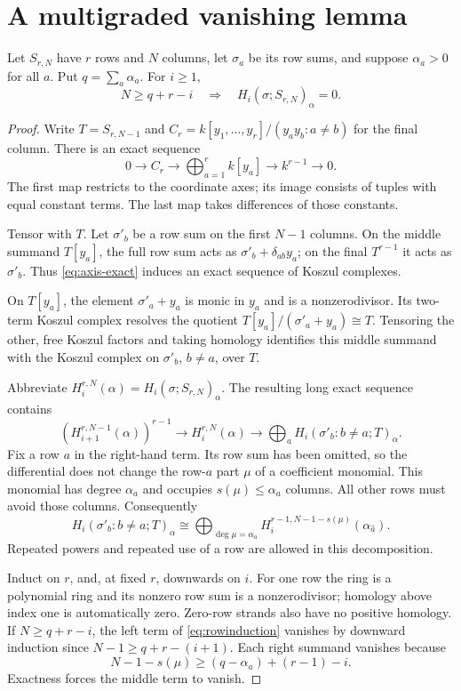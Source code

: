 \section{A multigraded vanishing lemma}
\begin{lemma}\label{lem:multigraded}
Let $S_{r,N}$ have $r$ rows and $N$ columns, let $\sigma_a$ be its row sums, and suppose $\alpha_a>0$ for all $a$. Put $q=\sum_a\alpha_a$. For $i\ge1$,
\[
 \boxed{N\ge q+r-i\quad\Longrightarrow\quad
 H_i(\sigma;S_{r,N})_\alpha=0.}
\]
\end{lemma}
\begin{proof}
Write $T=S_{r,N-1}$ and
$C_r=k[y_1,\ldots,y_r]/(y_ay_b:a\ne b)$ for the final column. There is an exact sequence
\begin{equation}\label{eq:axis-exact}
 0\longrightarrow C_r\longrightarrow\bigoplus_{a=1}^r k[y_a]
 \longrightarrow k^{r-1}\longrightarrow0.
\end{equation}
The first map restricts to the coordinate axes; its image consists of tuples with equal constant terms. The last map takes differences of those constants.

Tensor with $T$. Let $\sigma'_b$ be a row sum on the first $N-1$ columns. On the middle summand $T[y_a]$, the full row sum acts as $\sigma'_b+\delta_{ab}y_a$; on the final $T^{r-1}$ it acts as $\sigma'_b$. Thus \eqref{eq:axis-exact} induces an exact sequence of Koszul complexes.

On $T[y_a]$, the element $\sigma'_a+y_a$ is monic in $y_a$ and is a nonzerodivisor. Its two-term Koszul complex resolves the quotient $T[y_a]/(\sigma'_a+y_a)\cong T$. Tensoring the other, free Koszul factors and taking homology identifies this middle summand with the Koszul complex on $\sigma'_b$, $b\ne a$, over $T$.

Abbreviate $H_i^{r,N}(\alpha)=H_i(\sigma;S_{r,N})_\alpha$. The resulting long exact sequence contains
\begin{equation}\label{eq:rowinduction}
 (H_{i+1}^{r,N-1}(\alpha))^{r-1}
 \longrightarrow H_i^{r,N}(\alpha)
 \longrightarrow\bigoplus_a H_i(\sigma'_b:b\ne a;T)_\alpha.
\end{equation}
Fix a row $a$ in the right-hand term. Its row sum has been omitted, so the differential does not change the row-$a$ part $\mu$ of a coefficient monomial. This monomial has degree $\alpha_a$ and occupies $s(\mu)\le\alpha_a$ columns. All other rows must avoid those columns. Consequently
\[
 H_i(\sigma'_b:b\ne a;T)_\alpha
 \cong\bigoplus_{\deg\mu=\alpha_a}
 H_i^{r-1,N-1-s(\mu)}(\alpha_{\widehat a}).
\]
Repeated powers and repeated use of a row are allowed in this decomposition.

Induct on $r$, and, at fixed $r$, downwards on $i$. For one row the ring is a polynomial ring and its nonzero row sum is a nonzerodivisor; homology above index one is automatically zero. Zero-row strands also have no positive homology. If $N\ge q+r-i$, the left term of \eqref{eq:rowinduction} vanishes by downward induction since $N-1\ge q+r-(i+1)$. Each right summand vanishes because
\[
 N-1-s(\mu)\ge(q-\alpha_a)+(r-1)-i.
\]
Exactness forces the middle term to vanish.
\end{proof}

